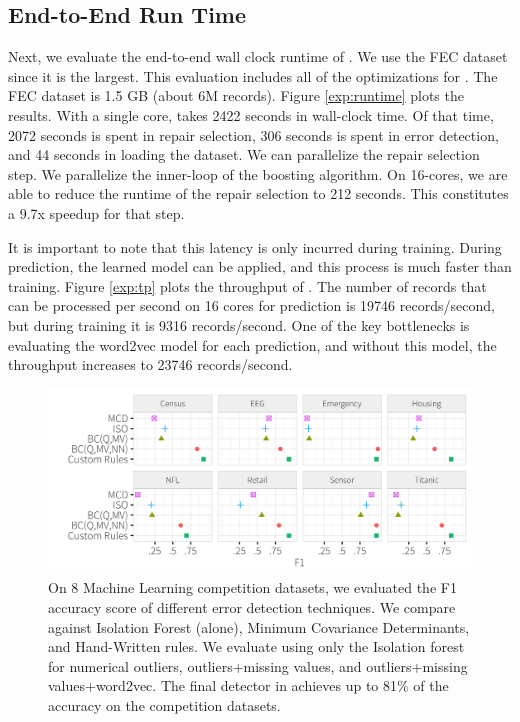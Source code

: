 \subsection{End-to-End Run Time}
Next, we evaluate the end-to-end wall clock runtime of \sys. We use the FEC dataset since it is the largest. This evaluation includes all of the optimizations for \sys. The FEC dataset is 1.5 GB (about 6M records). 
Figure \ref{exp:runtime} plots the results.
With a single core, \sys takes 2422 seconds in wall-clock time. Of that time, 2072 seconds is spent in repair selection, 306 seconds is spent in error detection, and 44 seconds in loading the dataset.
We can parallelize the repair selection step. We parallelize the inner-loop of the boosting algorithm. On 16-cores, we are able to reduce the runtime of the repair selection to 212 seconds. This constitutes a 9.7x speedup for that step.

It is important to note that this latency is only incurred during training. During prediction, the learned model can be applied, and this process is much faster than training. 
Figure \ref{exp:tp} plots the throughput of \sys.
The number of records that can be processed per second on 16 cores for prediction is 19746 records/second, but during training it is 9316 records/second. One of the key bottlenecks is evaluating the word2vec model for each prediction, and without this model, the throughput increases to 23746 records/second.

\begin{figure}[t]
\centering
 \includegraphics[width=\columnwidth]{exp/daccuracy.png}
 \caption{On 8 Machine Learning competition datasets, we evaluated the F1 accuracy score of different error detection techniques. We compare against Isolation Forest (alone), Minimum Covariance Determinants, and Hand-Written rules. We evaluate \sys using only the Isolation forest for numerical outliers, outliers+missing values, and outliers+missing values+word2vec.
 The final detector in \sys achieves up to 81\% of the accuracy on the competition datasets.
 \label{fig:derror}}
\end{figure}

